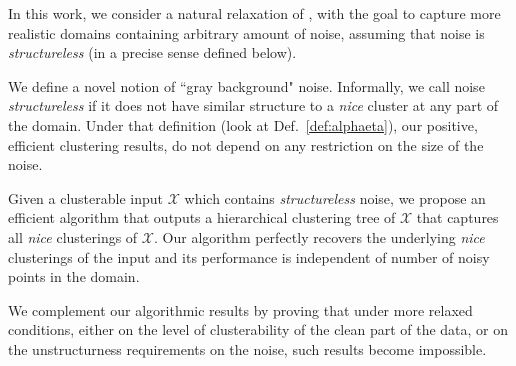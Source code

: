 \documentclass[anon,12pt]{colt2016} %
\newcommand{\mc}{\mathcal}
\begin{document}
In this work, we consider a natural relaxation of \cite{balcan2012clustering, ben2014clustering}, with the goal to capture more realistic domains containing arbitrary amount of noise, assuming that noise is \emph{structureless} (in a precise sense defined below). 

We define a novel notion of ``gray background" noise. Informally, we call noise {\em structureless} if it does not have similar structure to a {\em nice} cluster at any part of the domain. Under that definition (look at Def.~\ref{def:alphaeta}), our positive, efficient clustering results, do not depend on any restriction on the size of the noise.

Given a clusterable input $\mc X$ which contains {\em structureless} noise, we propose an efficient algorithm that outputs a hierarchical clustering tree of $\mc X$ that captures all {\em nice} clusterings of $\mc X$. Our algorithm perfectly recovers the underlying {\em nice} clusterings of the input and its performance is independent of number of noisy points in the domain. 

We complement our algorithmic results by proving that under more relaxed conditions, either on the level of clusterability of the clean part of the data, or on the unstructurness requirements on the noise, such results become impossible. 

\end{document}

